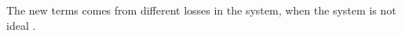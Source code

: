 The new terms comes from different losses in the system, when the system is not ideal \cite{friss_worksheet}.




